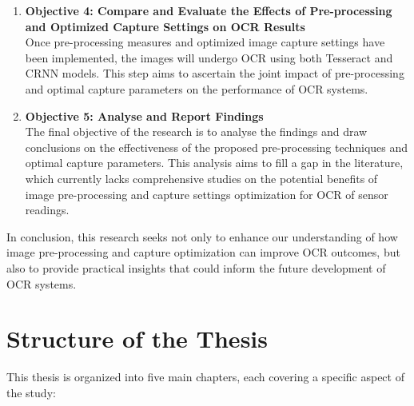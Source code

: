 \begin{enumerate}
      \item \textbf{Objective 4: Compare and Evaluate the Effects of Pre-processing and Optimized Capture Settings on OCR Results}\\
            Once pre-processing measures and optimized image capture settings have been implemented, the images will undergo OCR using both Tesseract and CRNN models. This step aims to ascertain the joint impact of pre-processing and optimal capture parameters on the performance of OCR systems.

      \item \textbf{Objective 5: Analyse and Report Findings}\\
            The final objective of the research is to analyse the findings and draw conclusions on the effectiveness of the proposed pre-processing techniques and optimal capture parameters. This analysis aims to fill a gap in the literature, which currently lacks comprehensive studies on the potential benefits of image pre-processing and capture settings optimization for OCR of sensor readings.
\end{enumerate}

In conclusion, this research seeks not only to enhance our understanding of how image pre-processing and capture optimization can improve OCR outcomes, but also to provide practical insights that could inform the future development of OCR systems.

\newpage

\section{Structure of the Thesis}

This thesis is organized into five main chapters, each covering a specific aspect of the study:

